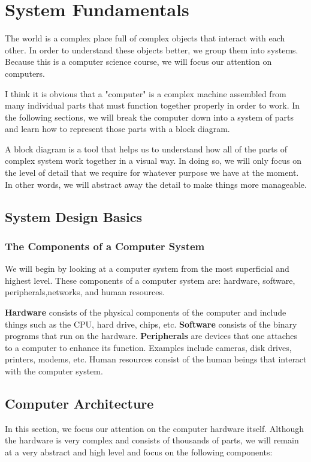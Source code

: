 \chapter{System Fundamentals}
The world is a complex place full of complex objects that interact with each other. In order to understand these objects better, we group them into systems. Because this is a computer science course, we will focus our attention on computers.

I think it is obvious that a "computer" is a complex machine assembled from many individual parts that must function together properly in order to work. In the following sections, we will break the computer down into a system of parts and learn how to represent those parts with a block diagram. 

A block diagram is a tool that helps us to understand how all of the parts of complex system work together in a visual way. In doing so, we will only focus on the level of detail that we require for whatever purpose we have at the moment. In other words, we will abstract away the detail to make things more manageable.

\section{System Design Basics}

\subsection*{The Components of a Computer System}
We will begin by looking at a computer system from the most superficial and highest level. These components of a computer system are: hardware, software, peripherals,networks, and human resources.

\textbf{Hardware} consists of the physical components of the computer and include things such as the CPU, hard drive, chips, etc. \textbf{Software} consists of the binary programs that run on the hardware. \textbf{Peripherals} are devices that one attaches to a computer to enhance its function. Examples include cameras, disk drives, printers, modems, etc. Human resources consist of the human beings that interact with the computer system. 

\section{Computer Architecture}
In this section, we focus our attention on the computer hardware itself. Although the hardware is very complex and consists of thousands of parts, we will remain at a very abstract and high level and focus on the following components: 

